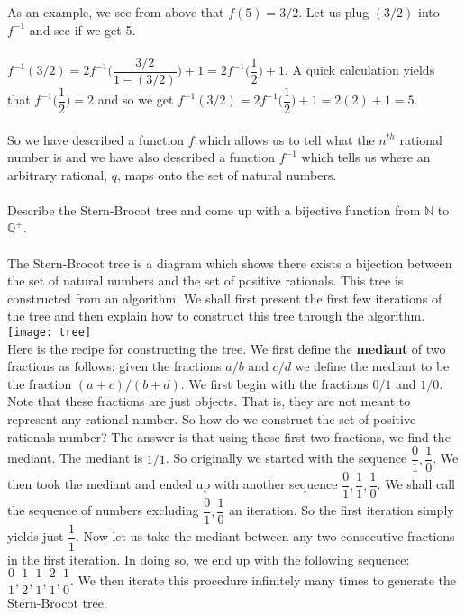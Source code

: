 \documentclass[12pt]{article}
\begin{document}
\noindent As an example, we see from above that $f(5)={3/2}$. Let us plug $(3/2)$ into $f^{-1}$ and see if we get 5. \\ \\
$f^{-1}(3/2)=2f^{-1} \bigg(\dfrac{3/2}{1-(3/2)} \bigg)+1=2f^{-1} \bigg(\dfrac{1}{2} \bigg)+1.$ A quick calculation yields that $f^{-1} \bigg(\dfrac{1}{2} \bigg)=2$ and so we get $f^{-1}(3/2)=2f^{-1} \bigg(\dfrac{1}{2} \bigg)+1=2(2)+1=5$. \\ \\

So we have described a function $f$ which allows us to tell what the $n^{th}$ rational number is and we have also described a function $f^{-1}$ which tells us where an arbitrary rational, $q$, maps onto the set of natural numbers. \\ \\


\problem Describe the Stern-Brocot tree and come up with a bijective function from $\mathbb{N}$ to $\mathbb{Q}^{+}$. \\ \\

The Stern-Brocot tree is a diagram which shows there exists a bijection between the set of natural numbers and the set of positive rationals. This tree is constructed from an algorithm. We shall first present the first few iterations of the tree and then explain how to construct this tree through the algorithm.  \\

\texttt{[image: tree]} \\

Here is the recipe for constructing the tree. We first define the \textbf{mediant} of two fractions as follows: given the fractions $a/b$ and $c/d$ we define the mediant to be the fraction $(a+c)/(b+d)$. We first begin with the fractions $0/1$ and $1/0$. Note that these fractions are just objects. That is, they are not meant to represent any rational number. So how do we construct the set of positive rationals number? The answer is that using these first two fractions, we find the mediant. The mediant is $1/1$. So originally we started with the sequence $\dfrac{0}{1}, \dfrac{1}{0}$.  We then took the mediant and ended up with another sequence $\dfrac{0}{1}, \dfrac{1}{1}, \dfrac{1}{0}$. We shall call the sequence of numbers excluding $\dfrac{0}{1}, \dfrac{1}{0}$ an iteration. So the first iteration simply yields just $\dfrac{1}{1}$. Now let us take the mediant between any two consecutive fractions in the first iteration. In doing so, we end up with the following sequence:  $\dfrac{0}{1}, \dfrac{1}{2}, \dfrac{1}{1}, \dfrac{2}{1}, \dfrac{1}{0}$.  We then iterate this procedure infinitely many times to generate the Stern-Brocot tree. \\ \\
\end{document}
